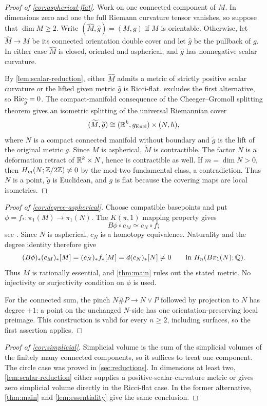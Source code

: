 \begin{proof}[Proof of \cref{cor:aspherical-flat}]
Work on one connected component of $M$. In dimensions zero and one the
full Riemann curvature tensor vanishes, so suppose that $\dim M\ge2$.
Write $(\widehat M,\widehat g)=(M,g)$ if $M$ is orientable. Otherwise,
let $\widehat M\to M$ be its connected orientation double cover and let
$\widehat g$ be the pullback of $g$. In either case $\widehat M$ is closed,
oriented and aspherical, and $\widehat g$ has nonnegative scalar curvature.

By \cref{lem:scalar-reduction}, either $\widehat M$ admits a metric of strictly
positive scalar curvature or the lifted given metric $\widehat g$ is Ricci-flat.
 excludes the first alternative, so
$\operatorname{Ric}_{\widehat g}=0$. The compact-manifold consequence of the Cheeger--Gromoll
splitting theorem \cite{CheegerGromoll1971} gives an isometric splitting
of the universal Riemannian cover
\[
 (\widetilde M,\widetilde g)
 \cong (\mathbb R^k,g_{\mathrm{Eucl}})\times (N,h),
\]
where $N$ is a compact connected manifold without boundary and
$\widetilde g$ is the lift of the original metric $g$. Since $M$ is aspherical,
$\widetilde M$ is contractible. The factor $N$ is a deformation retract
of $\mathbb R^k\times N$, hence is contractible as well. If $m=\dim N>0$,
then $H_m(N;\mathbb Z/2\mathbb Z)\ne0$ by the mod-two fundamental class, a contradiction.
Thus $N$ is a point, $\widetilde g$ is Euclidean, and $g$ is flat because
the covering maps are local isometries.
\end{proof}

\begin{proof}[Proof of \cref{cor:degree-aspherical}]
Choose compatible basepoints and put
$\phi=f_*:\pi_1(M)\to\pi_1(N)$. The $K(\pi,1)$ mapping property gives
\[
 B\phi\circ c_M\simeq c_N\circ f;
\]
see \cite[Theorem~1B.8 and Proposition~1B.9]{Hatcher2002}. Since $N$ is
aspherical, $c_N$ is a homotopy equivalence. Naturality and the degree
identity therefore give
\[
 (B\phi)_*(c_M)_*[M]
 =(c_N)_*f_*[M]
 =d(c_N)_*[N]\ne0
 \qquad\text{in }H_n(B\pi_1(N);\mathbb Q).
\]
Thus $M$ is rationally essential, and \cref{thm:main} rules out the
stated metric. No injectivity or surjectivity condition on $\phi$ is used.

For the connected sum, the pinch $N\#P\to N\vee P$ followed by projection
to $N$ has degree $+1$: a point on the unchanged $N$-side has one
orientation-preserving local preimage. This construction is valid for every
$n\ge2$, including surfaces, so the first assertion applies.
\end{proof}

\begin{proof}[Proof of \cref{cor:simplicial}]
Simplicial volume is the sum of the simplicial volumes of the finitely many
connected components, so it suffices to treat one component. The circle case
was proved in \cref{sec:reductions}. In dimensions at least two,
\cref{lem:scalar-reduction} either supplies a positive-scalar-curvature metric
or gives zero simplicial volume directly in the Ricci-flat case. In the former
alternative, \cref{thm:main} and \cref{lem:essentiality} give the same
conclusion.
\end{proof}
